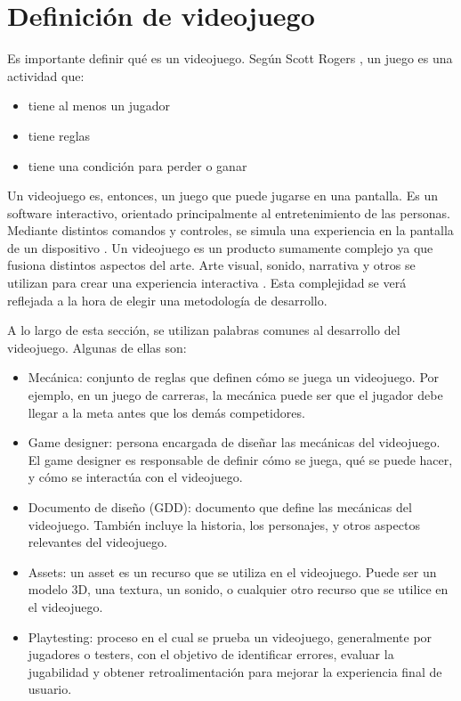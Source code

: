 \section{Definición de videojuego}
\par Es importante definir qué es un videojuego. Según Scott Rogers \cite{rogersLevelGuiaPara2024}, un juego es una actividad que:
\begin{itemize}
    \item tiene al menos un jugador
    \item tiene reglas
    \item tiene una condición para perder o ganar
\end{itemize}
\par Un videojuego es, entonces, un juego que puede jugarse en una pantalla. Es un software interactivo, orientado principalmente al entretenimiento de las personas. Mediante distintos comandos y controles, se simula una experiencia en la pantalla de un dispositivo \cite{alarconaldanaMetodologiaParaDesarrollo2020}. 
Un videojuego es un producto sumamente complejo ya que fusiona distintos aspectos del arte. Arte visual, sonido, narrativa y otros se utilizan para crear una experiencia interactiva \cite{garciaariasDesarrolloVideojuegosDesde2019}. Esta complejidad se verá reflejada a la hora de elegir una metodología de desarrollo.
\par A lo largo de esta sección, se utilizan palabras comunes al desarrollo del videojuego. Algunas de ellas son:
\begin{itemize}
    \item Mecánica: conjunto de reglas que definen cómo se juega un videojuego. Por ejemplo, en un juego de carreras, la mecánica puede ser que el jugador debe llegar a la meta antes que los demás competidores.
    \item Game designer: persona encargada de diseñar las mecánicas del videojuego. El game designer es responsable de definir cómo se juega, qué se puede hacer, y cómo se interactúa con el videojuego.
    \item Documento de diseño (GDD): documento que define las mecánicas del videojuego. También incluye la historia, los personajes, y otros aspectos relevantes del videojuego.
    \item Assets: un asset es un recurso que se utiliza en el videojuego. Puede ser un modelo 3D, una textura, un sonido, o cualquier otro recurso que se utilice en el videojuego.
    \item Playtesting: proceso en el cual se prueba un videojuego, generalmente por jugadores o testers, con el objetivo de identificar errores, evaluar la jugabilidad y obtener retroalimentación para mejorar la experiencia final de usuario.
\end{itemize} 


